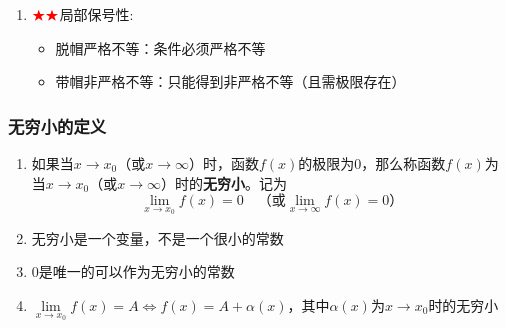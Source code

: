 \documentclass[../book.tex]{subfiles}
\begin{document}
\begin{enumerate}
\begin{itemize}
            \item 若$y = f(x)$在$[a, b]$上为连续函数，则$f(x)$在$[a, b]$上必定有界
            \item $\color{red}{\bigstar}$若$f(x)$在$(a, b)$内是连续函数，且$\lim\limits_{x\to a^+}f(x)$, $\lim\limits_{x\to b^-}f(x)$都存在，则$f(x)$在$(a, b)$内必定有界
            \item 有界函数与有界函数的{}仍为有界函数
            \item 若$\lim\limits_{x\to a^+}f(x)$存在，则存在$\delta > 0$，当$x\in(a, a + \delta)$时，$f(x)$有界
        \end{itemize}
        \item $\color{red}{\bigstar}\color{red}{\bigstar}$局部保号性:
        \begin{itemize}
            \item 脱帽严格不等：条件必须严格不等

            \item 带帽非严格不等：只能得到非严格不等（且需极限存在）
        \end{itemize}
    \end{enumerate}

    \subsubsection{无穷小的定义}

    \begin{enumerate}
        \item 如果当$x\to x_0$（或$x\to \infty$）时，函数$f(x)$的极限为$0$，那么称函数$f(x)$为当$x\to x_0$（或$x\to \infty$）时的\textbf{无穷小}。记为
        \[
            \lim\limits_{x \to x_0} f(x) = 0\quad \text{（或}\lim\limits_{x \to \infty} f(x) = 0\text{）}
        \]
        \item 无穷小是一个变量，不是一个很小的常数
        \item $0$是唯一的可以作为无穷小的常数
        \item $\lim\limits_{x \to x_0} f(x) = A \iff f(x) = A + \alpha(x)$，其中$\alpha(x)$为$x \to x_0$时的无穷小
    \end{enumerate}
\end{document}
